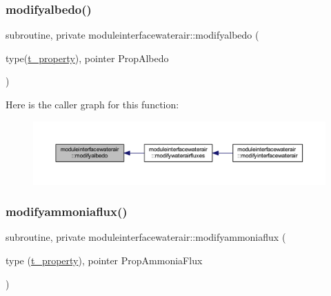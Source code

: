 \subsubsection{\texorpdfstring{modifyalbedo()}{modifyalbedo()}}
{\footnotesize\ttfamily subroutine, private moduleinterfacewaterair\+::modifyalbedo (\begin{DoxyParamCaption}\item[{type(\mbox{\hyperlink{structmoduleinterfacewaterair_1_1t__property}{t\+\_\+property}}), pointer}]{Prop\+Albedo }\end{DoxyParamCaption})\hspace{0.3cm}{\ttfamily [private]}}

Here is the caller graph for this function\+:\nopagebreak
\begin{figure}[H]
\begin{center}
\leavevmode
\includegraphics[width=350pt]{namespacemoduleinterfacewaterair_ad58b286425c066f4643dc56d5a605645_icgraph}
\end{center}
\end{figure}
\mbox{\label{namespacemoduleinterfacewaterair_a8f1f7fa64a06041e2cb84a386c86e9e1}} 
\subsubsection{\texorpdfstring{modifyammoniaflux()}{modifyammoniaflux()}}
{\footnotesize\ttfamily subroutine, private moduleinterfacewaterair\+::modifyammoniaflux (\begin{DoxyParamCaption}\item[{type (\mbox{\hyperlink{structmoduleinterfacewaterair_1_1t__property}{t\+\_\+property}}), pointer}]{Prop\+Ammonia\+Flux }\end{DoxyParamCaption})\hspace{0.3cm}{\ttfamily [private]}}

